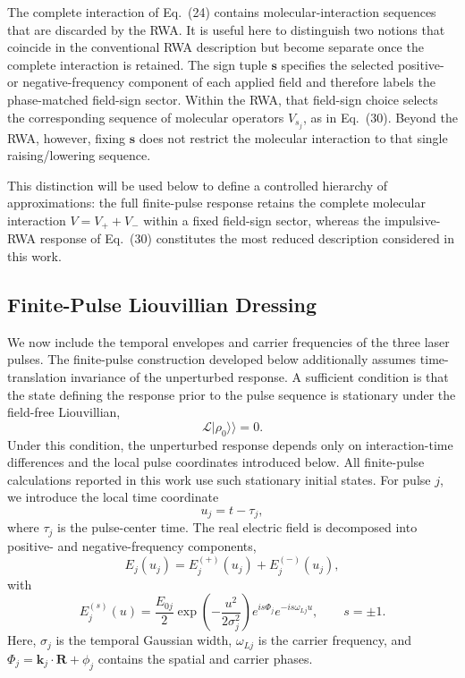The complete interaction of Eq.~(24) contains molecular-interaction
sequences that are discarded by the RWA. It is useful here to
distinguish two notions that coincide in the conventional RWA
description but become separate once the complete interaction is
retained. The sign tuple $\mathbf{s}$ specifies the selected
positive- or negative-frequency component of each applied field and
therefore labels the phase-matched field-sign sector. Within the RWA,
that field-sign choice selects the corresponding sequence of molecular
operators $V_{s_j}$, as in Eq.~(30). Beyond the RWA, however, fixing
$\mathbf{s}$ does not restrict the molecular interaction to that single
raising/lowering sequence.

This distinction will be used below to define a controlled hierarchy
of approximations: the full finite-pulse response retains the complete
molecular interaction $V=V_{+}+V_{-}$ within a fixed field-sign sector,
whereas the impulsive-RWA response of Eq.~(30) constitutes the most
reduced description considered in this work.

\subsection{Finite-Pulse Liouvillian Dressing}
\label{sec:finite_pulse}

We now include the temporal envelopes and carrier frequencies of the
three laser pulses. 
The finite-pulse construction developed below additionally assumes
time-translation invariance of the unperturbed response. A sufficient
condition is that the state defining the response prior to the pulse
sequence is stationary under the field-free Liouvillian,
%
\begin{equation}
\mathcal{L}|\rho_0\rangle\rangle=0.
\label{eq:stationary_initial_state}
\end{equation}
%
Under this condition, the unperturbed response depends only on
interaction-time differences and the local pulse coordinates introduced
below. All finite-pulse calculations reported in this work use such
stationary initial states.
For pulse $j$, we introduce the local time coordinate
%
\begin{equation}
u_j = t-\tau_j,
\end{equation}
%
where $\tau_j$ is the pulse-center time. The real electric field is
decomposed into positive- and negative-frequency components,
%
\begin{equation}
E_j(u_j)
=
E_j^{(+)}(u_j)
+
E_j^{(-)}(u_j),
\end{equation}
%
with
%
\begin{equation}
E_j^{(s)}(u)
=
\frac{E_{0j}}{2}
\exp\left(
-\frac{u^2}{2\sigma_j^2}
\right)
e^{is\Phi_j}
e^{-is\omega_{Lj}u},
\qquad
s=\pm 1.
\label{eq:gaussian_field_component}
\end{equation}
%
Here, $\sigma_j$ is the temporal Gaussian width,
$\omega_{Lj}$ is the carrier frequency, and
$\Phi_j=\mathbf{k}_j\cdot\mathbf{R}+\phi_j$ contains the spatial and
carrier phases.

